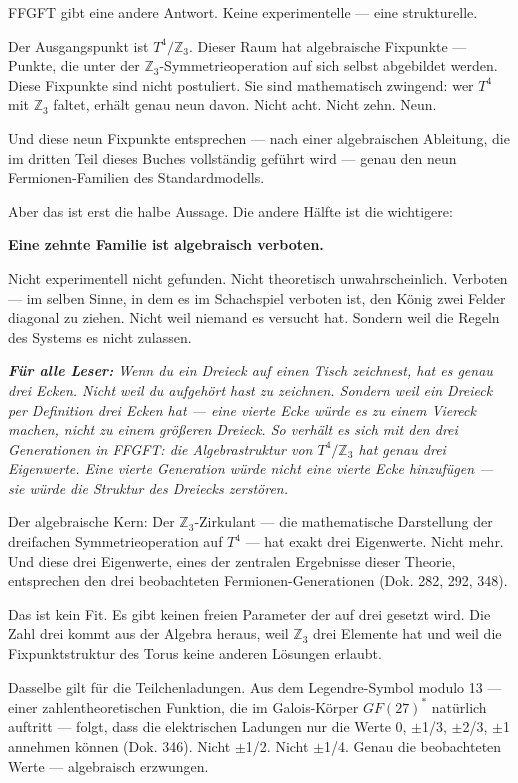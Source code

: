 \documentclass[11pt,oneside]{book}
\newenvironment{laierspur}{%
  \par\vspace{4pt}%
  \noindent\small\itshape\color{blue!60!black}%
  \textbf{Für alle Leser:}\enspace\ignorespaces}{%
  \par\vspace{4pt}\normalsize\normalfont\normalcolor}
\begin{document}
FFGFT gibt eine andere Antwort. Keine experimentelle — eine strukturelle.


Der Ausgangspunkt ist $T^4/\mathbb{Z}_3$. Dieser Raum hat algebraische Fixpunkte —
Punkte, die unter der $\mathbb{Z}_3$-Symmetrieoperation auf sich selbst abgebildet
werden. Diese Fixpunkte sind nicht postuliert. Sie sind mathematisch
zwingend: wer $T^4$ mit $\mathbb{Z}_3$ faltet, erhält genau neun davon. Nicht acht. Nicht
zehn. Neun.


Und diese neun Fixpunkte entsprechen — nach einer algebraischen Ableitung,
die im dritten Teil dieses Buches vollständig geführt wird — genau den neun
Fermionen-Familien des Standardmodells.


Aber das ist erst die halbe Aussage. Die andere Hälfte ist die wichtigere:


\textbf{Eine zehnte Familie ist algebraisch verboten.}


Nicht experimentell nicht gefunden. Nicht theoretisch unwahrscheinlich.
Verboten — im selben Sinne, in dem es im Schachspiel verboten ist, den König
zwei Felder diagonal zu ziehen. Nicht weil niemand es versucht hat. Sondern
weil die Regeln des Systems es nicht zulassen.


\begin{laierspur}
Wenn du ein Dreieck auf einen Tisch zeichnest, hat es genau
drei Ecken. Nicht weil du aufgehört hast zu zeichnen. Sondern weil ein
Dreieck per Definition drei Ecken hat — eine vierte Ecke würde es zu einem
Viereck machen, nicht zu einem größeren Dreieck. So verhält es sich mit
den drei Generationen in FFGFT: die Algebrastruktur von $T^4/\mathbb{Z}_3$ hat genau
drei Eigenwerte. Eine vierte Generation würde nicht eine vierte Ecke
hinzufügen — sie würde die Struktur des Dreiecks zerstören.
\end{laierspur}

Der algebraische Kern: Der $\mathbb{Z}_3$-Zirkulant — die mathematische Darstellung der
dreifachen Symmetrieoperation auf $T^4$ — hat exakt drei Eigenwerte. Nicht
mehr. Und diese drei Eigenwerte, eines der zentralen Ergebnisse dieser
Theorie, entsprechen den drei beobachteten Fermionen-Generationen (Dok. 282,
292, 348).


Das ist kein Fit. Es gibt keinen freien Parameter der auf drei gesetzt wird.
Die Zahl drei kommt aus der Algebra heraus, weil $\mathbb{Z}_3$ drei Elemente hat und
weil die Fixpunktstruktur des Torus keine anderen Lösungen erlaubt.


Dasselbe gilt für die Teilchenladungen. Aus dem Legendre-Symbol modulo 13 —
einer zahlentheoretischen Funktion, die im Galois-Körper $GF(27)^*$ natürlich
auftritt — folgt, dass die elektrischen Ladungen nur die Werte 0, $\pm$1/3,
$\pm$2/3, $\pm$1 annehmen können (Dok. 346). Nicht $\pm$1/2. Nicht $\pm$1/4. Genau die
beobachteten Werte — algebraisch erzwungen.
\end{document}
